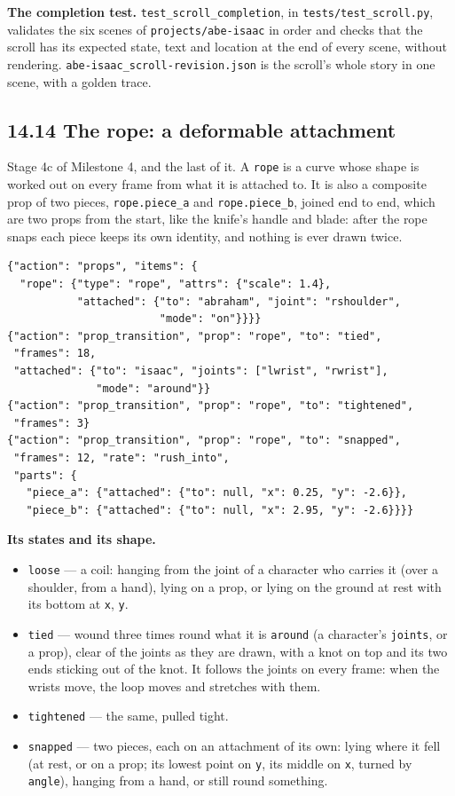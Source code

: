 \documentclass[
  12pt,
  letterpaper,
]{book}
\providecommand{\tightlist}{%
  \setlength{\itemsep}{0pt}\setlength{\parskip}{0pt}}
\begin{document}
\textbf{The completion test.} \texttt{test\_scroll\_completion}, in
\texttt{tests/test\_scroll.py}, validates the six scenes of
\texttt{projects/abe-isaac} in order and checks that the scroll has its
expected state, text and location at the end of every scene, without
rendering. \texttt{abe-isaac\_scroll-revision.json} is the scroll's
whole story in one scene, with a golden trace.

\subsection{14.14 The rope: a deformable attachment}\label{rope}

Stage 4c of Milestone 4, and the last of it. A \texttt{rope} is a curve
whose shape is worked out on every frame from what it is attached to.
It is also a composite prop of two pieces, \texttt{rope.piece\_a} and
\texttt{rope.piece\_b}, joined end to end, which are two props from
the start, like the knife's handle and blade: after the rope snaps each
piece keeps its own identity, and nothing is ever drawn twice.

\begin{verbatim}
{"action": "props", "items": {
  "rope": {"type": "rope", "attrs": {"scale": 1.4},
           "attached": {"to": "abraham", "joint": "rshoulder",
                        "mode": "on"}}}}
{"action": "prop_transition", "prop": "rope", "to": "tied",
 "frames": 18,
 "attached": {"to": "isaac", "joints": ["lwrist", "rwrist"],
              "mode": "around"}}
{"action": "prop_transition", "prop": "rope", "to": "tightened",
 "frames": 3}
{"action": "prop_transition", "prop": "rope", "to": "snapped",
 "frames": 12, "rate": "rush_into",
 "parts": {
   "piece_a": {"attached": {"to": null, "x": 0.25, "y": -2.6}},
   "piece_b": {"attached": {"to": null, "x": 2.95, "y": -2.6}}}}
\end{verbatim}

\textbf{Its states and its shape.}

\begin{itemize}
\tightlist
\item
  \texttt{loose} --- a coil: hanging from the joint of a character who
  carries it (over a shoulder, from a hand), lying on a prop, or lying
  on the ground at rest with its bottom at \texttt{x}, \texttt{y}.
\item
  \texttt{tied} --- wound three times round what it is
  \texttt{around} (a character's \texttt{joints}, or a prop), clear of
  the joints as they are drawn, with a knot on top and its two ends
  sticking out of the knot. It follows the joints on every frame: when
  the wrists move, the loop moves and stretches with them.
\item
  \texttt{tightened} --- the same, pulled tight.
\item
  \texttt{snapped} --- two pieces, each on an attachment of its own:
  lying where it fell (at rest, or on a prop; its lowest point on
  \texttt{y}, its middle on \texttt{x}, turned by \texttt{angle}),
  hanging from a hand, or still round something.
\end{itemize}
\end{document}
